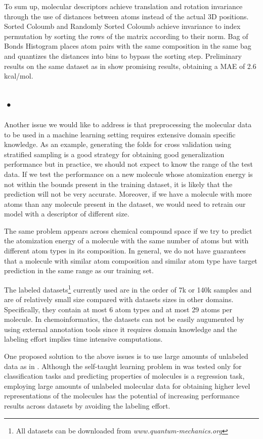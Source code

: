 \documentclass[10pt,journal,a4paper]{IEEEtran}
\begin{document}
To sum up, molecular descriptors achieve translation and rotation invariance through the use of
distances between atoms instead of the actual 3D positions. Sorted Coloumb and Randomly Sorted Coloumb achieve invariance to index permutation by sorting the rows of the matrix according to their norm. Bag of Bonds Histogram places atom pairs with the same composition in the same bag and quantizes the distances into bins to bypass the sorting step. Preliminary results on the same dataset as in \cite{montavon2012learning}  show promising results, obtaining a MAE of 2.6 kcal/mol.

\subsection*{•}
Another issue we would like to address is that preprocessing the molecular data to be used in a machine learning setting requires extensive domain specific knowledge. As an example, generating the folds for cross validation using stratified sampling is a good strategy for obtaining good generalization performance but in practice, we should not expect to know the range of the test data. If we test the performance on a new molecule whose atomization energy is not within the bounds present in the training dataset, it is likely that the prediction will not be very accurate. Moreover, if we have a molecule with more atoms than any molecule present in the dataset, we would need to retrain our model with a  descriptor of different size. 

The same problem appears across chemical compound space if we try to predict the atomization energy of a molecule with the same number of atoms but with different atom types in its composition. In general, we do not have guarantees that a molecule with similar atom composition and similar atom type have target prediction in the same range as our training set.

The labeled datasets\footnote{All datasets can be downloaded from \textit{www.quantum-mechanics.org}} currently used  are in the order of 7k or 140k samples and are of relatively small size compared with datasets sizes in other domains. Specifically, they contain at most 6 atom types and at most 29 atoms per molecule. In chemoinformatics, the datasets can not be easily augumented by using external annotation tools since it requires domain knowledge and the labeling effort implies time intensive computations.

One proposed solution to the above issues is to use large amounts of unlabeled data as in \cite{selftaughtl}.
Although the self-taught learning problem in \cite{selftaughtl} was tested only for classification tasks and predicting properties of molecules is a regression task, employing large amounts of unlabeled molecular data for obtaining higher level representations of the molecules has the potential of increasing performance results across datasets by avoiding the labeling effort.
\end{document}
